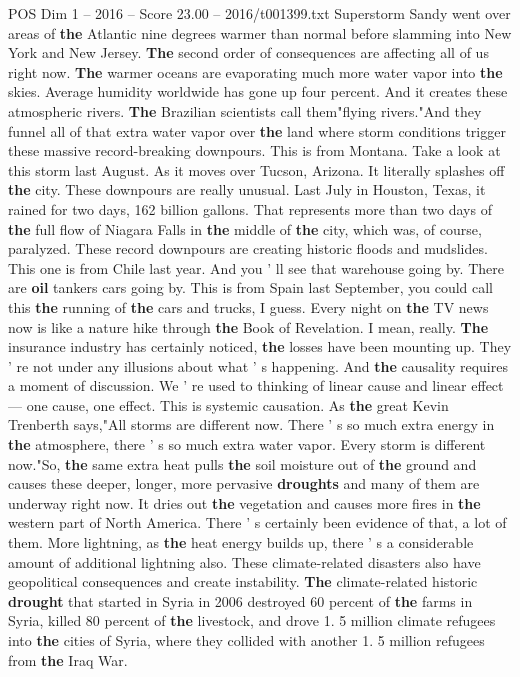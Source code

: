 \begin{textsample}{POS Dim 1 – 2016 – Score 23.00 – 2016/t001399.txt}
Superstorm Sandy went over areas of \textbf{the} Atlantic nine degrees warmer than normal before slamming into New York and New Jersey. \textbf{The} second order of consequences are affecting all of us right now. \textbf{The} warmer oceans are evaporating much more water vapor into \textbf{the} skies.
Average humidity worldwide has gone up four percent.
And it creates these atmospheric rivers. \textbf{The} Brazilian scientists call them"flying rivers."And they funnel all of that extra water vapor over \textbf{the} land where storm conditions trigger these massive record-breaking downpours.
This is from Montana.
Take a look at this storm last August.
As it moves over Tucson, Arizona.
It literally splashes off \textbf{the} city.
These downpours are really unusual.
Last July in Houston, Texas, it rained for two days, 162 billion gallons.
That represents more than two days of \textbf{the} full flow of Niagara Falls in \textbf{the} middle of \textbf{the} city, which was, of course, paralyzed.
These record downpours are creating historic floods and mudslides.
This one is from Chile last year.
And you ' ll see that warehouse going by.
There are \textbf{oil} tankers cars going by.
This is from Spain last September, you could call this \textbf{the} running of \textbf{the} cars and trucks, I guess.
Every night on \textbf{the} TV news now is like a nature hike through \textbf{the} Book of Revelation.
I mean, really. \textbf{The} insurance industry has certainly noticed, \textbf{the} losses have been mounting up.
They ' re not under any illusions about what ' s happening.
And \textbf{the} causality requires a moment of discussion.
We ' re used to thinking of linear cause and linear effect — one cause, one effect.
This is systemic causation.
As \textbf{the} great Kevin Trenberth says,"All storms are different now.
There ' s so much extra energy in \textbf{the} atmosphere, there ' s so much extra water vapor.
Every storm is different now."So, \textbf{the} same extra heat pulls \textbf{the} soil moisture out of \textbf{the} ground and causes these deeper, longer, more pervasive \textbf{droughts} and many of them are underway right now.
It dries out \textbf{the} vegetation and causes more fires in \textbf{the} western part of North America.
There ' s certainly been evidence of that, a lot of them.
More lightning, as \textbf{the} heat energy builds up, there ' s a considerable amount of additional lightning also.
These climate-related disasters also have geopolitical consequences and create instability. \textbf{The} climate-related historic \textbf{drought} that started in Syria in 2006 destroyed 60 percent of \textbf{the} farms in Syria, killed 80 percent of \textbf{the} livestock, and drove 1. 5 million climate refugees into \textbf{the} cities of Syria, where they collided with another 1. 5 million refugees from \textbf{the} Iraq War.

\end{textsample}
